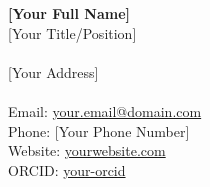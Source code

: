 \documentclass[11pt,letterpaper]{article}
\newcommand{\yourname}{[Your Full Name]} %
\begin{document}
\thispagestyle{empty}

\begin{center}
{\LARGE \textbf{\yourname}} \\[0.3cm]
[Your Title/Position] \\
[Your Institution/Affiliation] \\[0.2cm]
[Your Address] \\
[City, State, ZIP] \\[0.2cm]
Email: \href{mailto:your.email@domain.com}{your.email@domain.com} \\
Phone: [Your Phone Number] \\
Website: \href{https://yourwebsite.com}{yourwebsite.com} \\
ORCID: \href{https://orcid.org/your-orcid}{your-orcid}
\end{center}

\vspace{0.5cm}

\end{document}
